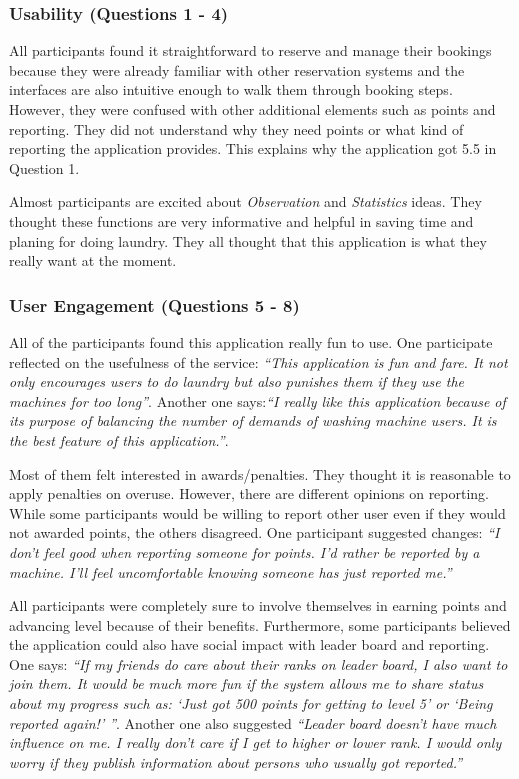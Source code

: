 \subsubsection{Usability (Questions 1 - 4)}
All participants found it straightforward to reserve and manage their bookings because they were already familiar with other reservation systems and the interfaces are also intuitive enough to walk them through booking steps. However, they were confused with other additional elements such as points and reporting. They did not understand why they need points or what kind of reporting the application provides. This explains why the application got 5.5 in Question 1.

Almost participants are excited about \emph{Observation} and \emph{Statistics} ideas. They thought these functions are very informative and helpful in saving time and planing for doing laundry. They all thought that this application is what they really want at the moment. 
\subsubsection{User Engagement (Questions 5 - 8)}
All of the participants found this application really fun to use. One participate reflected on the usefulness of the service: \textit{``This application is fun and fare. It not only encourages users to do laundry but also punishes them if they use the machines for too long''}. Another one says:\textit{``I really like this application because of its purpose of balancing the number of demands of washing machine users. It is the best feature of this application.''}.

Most of them felt interested in awards/penalties. They thought it is reasonable to apply penalties on overuse. However, there are different opinions on reporting. While some participants would be willing to report other user even if they would not awarded points, the others disagreed. One participant suggested changes: \textit{``I don't feel good when reporting someone for points. I'd rather be reported by a machine. I'll feel uncomfortable knowing someone has just reported me.''} 

All participants were completely sure to involve themselves in earning points and advancing level because of their benefits. Furthermore, some participants believed the application could also have social impact with leader board and reporting. One says: \textit{``If my friends do care about their ranks on leader board, I also want to join them. It would be much more fun if the system allows me to share status about my progress such as: `Just got 500 points for getting to level 5' or `Being reported again!' ''}. Another one also suggested \textit{``Leader board doesn't have much influence on me. I really don't care if I get to higher or lower rank. I would only worry if they publish information about persons who usually got reported.''}
